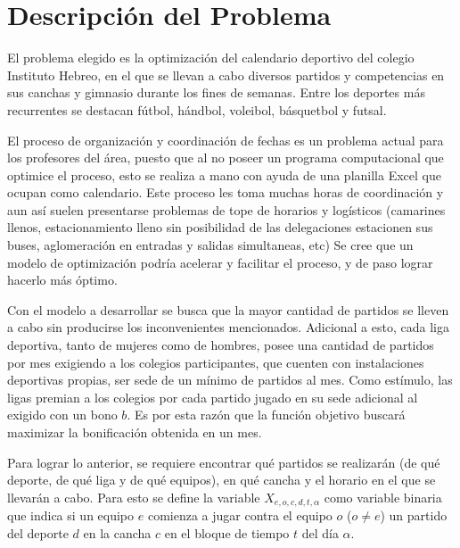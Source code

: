 \section{Descripción del Problema}

\indent El problema elegido es la optimización del calendario deportivo del colegio Instituto Hebreo, en el que se llevan a cabo diversos partidos y competencias en sus canchas y gimnasio durante los fines de semanas. Entre los deportes más recurrentes se destacan fútbol, hándbol, voleibol, básquetbol y futsal. 

\indent El proceso de organización y coordinación de fechas es un problema actual para los profesores del área, puesto que al no poseer un programa computacional que optimice el proceso, esto se realiza a mano con ayuda de una planilla Excel que ocupan como calendario. Este proceso les toma muchas horas de coordinación y aun así suelen presentarse problemas de tope de horarios y logísticos (camarines llenos, estacionamiento lleno sin posibilidad de las delegaciones estacionen sus buses, aglomeración en entradas y salidas simultaneas, etc) Se cree que un modelo de optimización podría acelerar y facilitar el proceso, y de paso lograr hacerlo más óptimo. 

\indent Con el modelo a desarrollar se busca que la mayor cantidad de partidos se lleven a cabo sin producirse los inconvenientes mencionados. Adicional a esto, cada liga deportiva, tanto de mujeres como de hombres, posee una cantidad de partidos por mes exigiendo a los colegios participantes, que cuenten con instalaciones deportivas propias, ser sede de un mínimo de partidos al mes. Como estímulo, las ligas premian a los colegios por cada partido jugado en su sede adicional al exigido con un bono $b$. Es por esta razón que la función objetivo buscará maximizar la bonificación obtenida en un mes. 

\indent Para lograr lo anterior, se requiere encontrar qué partidos se realizarán (de qué deporte, de qué liga y de qué equipos), en qué cancha y el horario en el que se llevarán a cabo. Para esto se define la variable $X_{e,o,c,d,t,\alpha}$ como variable binaria que indica si un equipo $e$ comienza a jugar contra el equipo $o$ ($o\neq e$) un partido del deporte $d$ en la cancha $c$ en el bloque de tiempo $t$ del día $\alpha$.


